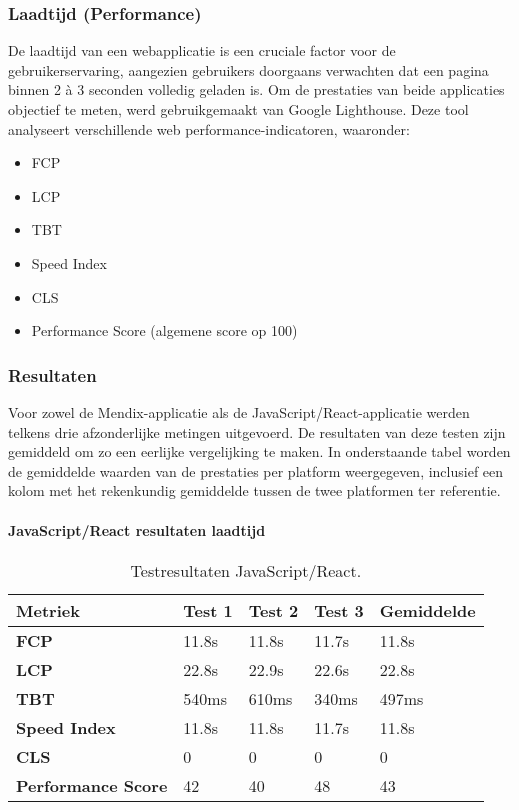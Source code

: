 \subsubsection{Laadtijd (Performance)}
De laadtijd van een webapplicatie is een cruciale factor voor de gebruikerservaring, aangezien gebruikers doorgaans verwachten dat een pagina binnen 2 à 3 seconden volledig geladen is. Om de prestaties van beide applicaties objectief te meten, werd gebruikgemaakt van Google Lighthouse. Deze tool analyseert verschillende web performance-indicatoren, waaronder:
\begin{itemize}
    \item \gls{FCP}
    \item \gls{LCP}
    \item \gls{TBT}
    \item Speed Index
    \item \gls{CLS}
    \item Performance Score (algemene score op 100)
\end{itemize}

\subsubsection{Resultaten}

Voor zowel de Mendix-applicatie als de JavaScript/React-applicatie werden telkens drie afzonderlijke metingen uitgevoerd. De resultaten van deze testen zijn gemiddeld om zo een eerlijke vergelijking te maken. In onderstaande tabel worden de gemiddelde waarden van de prestaties per platform weergegeven, inclusief een kolom met het rekenkundig gemiddelde tussen de twee platformen ter referentie.

\newpage
\paragraph{JavaScript/React resultaten laadtijd}

\begin{table}[h]
    \centering
    \begin{tabular}{ |p{3cm}|p{2.75cm}|p{2.75cm}|p{2.75cm}|p{2.75cm}|}
        \hline
        \textbf{Metriek} & \textbf{Test 1} & \textbf{Test 2}  & \textbf{Test 3} & \textbf{Gemiddelde}\\
        \hline
        \textbf{\gls{FCP}}  & 11.8s & 11.8s & 11.7s & 11.8s \\
        \hline
        \textbf{\gls{LCP}} & 22.8s & 22.9s & 22.6s & 22.8s\\
        \hline
        \textbf{\gls{TBT}}  & 540ms & 610ms & 340ms & 497ms \\
        \hline
        \textbf{Speed Index}  & 11.8s & 11.8s & 11.7s & 11.8s \\
        \hline
        \textbf{\gls{CLS}}  & 0 & 0  & 0 & 0 \\
        \hline
        \textbf{Performance Score}  & 42 & 40  & 48 & 43 \\
        \hline
    \end{tabular}
    \caption[\centering Testresultaten laadtijd JavaScript/React]{\label{tab:Testresultaten JavaScript/React}Testresultaten JavaScript/React.}
\end{table}

